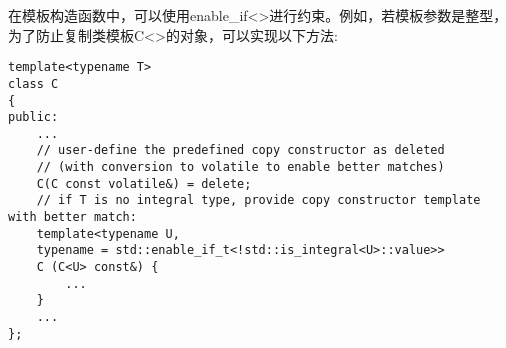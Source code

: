 在模板构造函数中，可以使用enable\_if<>进行约束。例如，若模板参数是整型，为了防止复制类模板C<>的对象，可以实现以下方法:

\begin{lstlisting}[style=styleCXX]
template<typename T>
class C
{
public:
	...
	// user-define the predefined copy constructor as deleted
	// (with conversion to volatile to enable better matches)
	C(C const volatile&) = delete;
	// if T is no integral type, provide copy constructor template with better match:
	template<typename U,
	typename = std::enable_if_t<!std::is_integral<U>::value>>
	C (C<U> const&) {
		...
	}
	...
};
\end{lstlisting}












